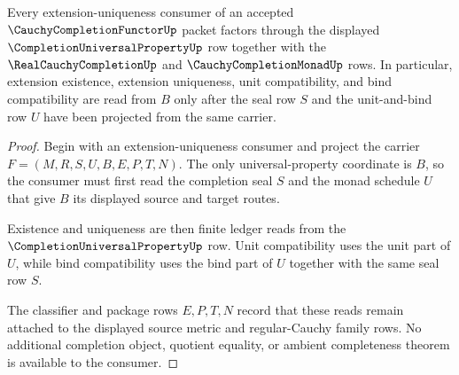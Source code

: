 \begin{theorem}
\label{thm:cauchycompletionfunctor-universal-property-extension-exactness}
Every extension-uniqueness consumer of an accepted $\CauchyCompletionFunctorUp$ packet factors through the displayed $\CompletionUniversalPropertyUp$ row together with the $\RealCauchyCompletionUp$ and $\CauchyCompletionMonadUp$ rows. In particular, extension existence, extension uniqueness, unit compatibility, and bind compatibility are read from $B$ only after the seal row $S$ and the unit-and-bind row $U$ have been projected from the same carrier.
\end{theorem}
\begin{proof}
Begin with an extension-uniqueness consumer and project the carrier $F=(M,R,S,U,B,E,P,T,N)$. The only universal-property coordinate is $B$, so the consumer must first read the completion seal $S$ and the monad schedule $U$ that give $B$ its displayed source and target routes.

Existence and uniqueness are then finite ledger reads from the $\CompletionUniversalPropertyUp$ row. Unit compatibility uses the unit part of $U$, while bind compatibility uses the bind part of $U$ together with the same seal row $S$.

The classifier and package rows $E,P,T,N$ record that these reads remain attached to the displayed source metric and regular-Cauchy family rows. No additional completion object, quotient equality, or ambient completeness theorem is available to the consumer.
\end{proof}

